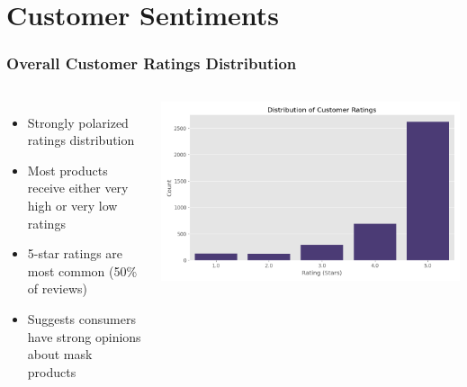 \documentclass[aspectratio=169]{beamer}
\begin{document}
\section{Customer Sentiments}

\begin{frame}
\frametitle{Overall Customer Ratings Distribution}
\begin{columns}
\begin{itemize}
    \item Strongly polarized ratings distribution
    \item Most products receive either very high or very low ratings
    \item 5-star ratings are most common (50\% of reviews)
    \item Suggests consumers have strong opinions about mask products
\end{itemize}
\includegraphics[width=\textwidth]{plots/ratings_distribution.png}
\end{columns}
\end{frame}
\end{document}

